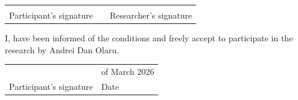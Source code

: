 \bigskip\bigskip

\noindent
\begin{tabular}{p{6cm} p{1cm} p{6cm}}
\underline{\hspace{6cm}} & & \underline{\hspace{6cm}} \\
Participant's signature & & Researcher's signature \\
\end{tabular}

\bigskip\bigskip

I, \underline{\hspace{7cm}} have been informed of the conditions and freely accept to participate in the research by Andrei Dan Olaru.

\bigskip

\noindent
\begin{tabular}{p{6cm} p{5cm}}
\underline{\hspace{6cm}} & \underline{\hspace{3cm}} of March 2026 \\
Participant's signature & Date \\
\end{tabular}


\newpage
